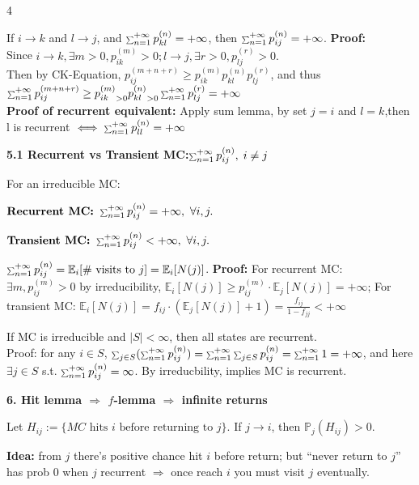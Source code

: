 \documentclass[a4paper, landscape]{article}
\newcommand{\topic}[1]{\par\medskip\textbf{#1}\par}
\newcommand{\subtopic}[1]{\par\textbf{#1}}
\newcommand{\smallsum}{\mathop{\scalebox{0.65}{$\sum$}}\nolimits}
\renewcommand{\topic}[1]{\par\medskip\noindent\colorbox{highlightcolor}{\parbox{\dimexpr\columnwidth-2\fboxsep\relax}{\textbf{#1}}}\par}
\renewcommand{\subtopic}[1]{\par\textbf{\color{blue}{#1}}} %
\begin{document}
\begin{multicols}{4}
\subtopic{Sum lemma:}
If $i\to k$ and $l\to j$, and $\smallsum_{n=1}^{+\infty}p^{(n)}_{kl}=+\infty$, then
$\smallsum_{n=1}^{+\infty}p^{(n)}_{ij}=+\infty$.  \textbf{Proof:}\\
Since $i\to k,\exists m>0, p_{ik}^{(m)}>0;l\to j,\exists r>0, p_{lj}^{(r)}>0.$\\Then by CK-Equation, $p_{ij}^{(m+n+r)}\geq p_{ik}^{(m)} p_{kl}^{(n)}p_{lj}^{(r)}$, and thus $\smallsum_{n=1}^{+\infty}p_{ij}^{(m+n+r)}\geq{p_{ik}^{(m)}}_{>0} {p_{kl}^{(n)}}_{>0} \smallsum_{n=1}^{+\infty}p_{lj}^{(r)}=+\infty$\\
\textbf{Proof of recurrent equivalent:} Apply sum lemma, by set $j=i$ and $l=k$,then l is recurrent $\iff\smallsum_{n=1}^{+\infty}p_{ll}^{(n)}=+\infty$



\topic{5.1 Recurrent vs Transient MC:$\smallsum_{n=1}^{+\infty} p^{(n)}_{ij},\; i\neq j$}
\subtopic{Fact:} For an irreducible MC:
\par $\textbf{Recurrent MC: }\smallsum_{n=1}^{+\infty}p^{(n)}_{ij}=+\infty,\ \forall i,j.$
\par $\textbf{Transient MC: }\smallsum_{n=1}^{+\infty}p^{(n)}_{ij}<+\infty,\ \forall i,j.$


\subtopic{Notation:}
$\smallsum_{n=1}^{+\infty}p^{(n)}_{ij}=\mathbb E_i[\#\text{ visits to }j]=\mathbb E_i[N(j)]$.
\textbf{Proof:} For recurrent MC: $\exists m, p_{ij}^{(m)}>0$ by irreducibility, $\mathbb E_i[N(j)]\geq p_{ij}^{(m)}\cdot \mathbb E_j[N(j)]=+\infty$; For transient MC:  $\mathbb E_i[N(j)]= f_{ij}\cdot (\mathbb E_j[N(j)]+1)=\frac{f_{ij}}{1-f_{jj}}<+\infty$

\subtopic{Finite Space special case:}
If MC is irreducible and $|S|<\infty$, then all states are recurrent.\\
Proof: for any $i\in S$, $\smallsum_{j\in S}(\smallsum_{n=1}^{+\infty}p_{ij}^{(n)})=\smallsum_{n=1}^{+\infty} \smallsum_{j\in S} p_{ij}^{(n)}=\smallsum_{n=1}^{+\infty}1=+\infty$, and here $\exists j\in S$ s.t. $\smallsum_{n=1}^{+\infty}p_{ij}^{(n)}=\infty$.
By irreducbility, implies MC is recurrent.

\topic{6. Hit lemma $\Rightarrow$ $f$-lemma $\Rightarrow$ infinite returns}
\subtopic{Hit lemma:}
Let $H_{ij}:=\{MC \text{ hits }i\text{ before returning to }j\}.$ If $j\to i$, then $\mathbb P_j(H_{ij})>0$.

\textbf{Idea:} from $j$ there’s positive chance hit $i$ before return; but “never return to $j$” has prob $0$ when $j$ recurrent $\Rightarrow$ once reach $i$ you must visit $j$ eventually.


\end{multicols}
\end{document}
